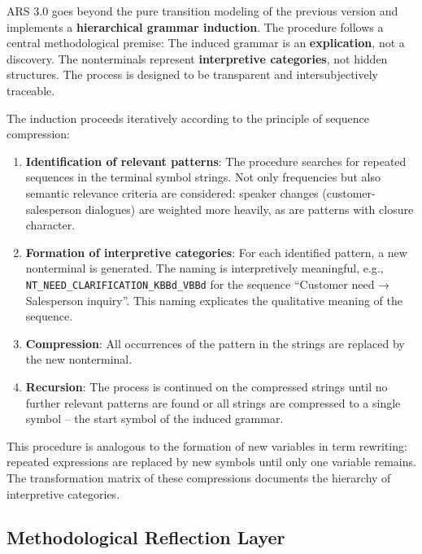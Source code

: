 \documentclass[
  12pt,
  a4paper,
  oneside,
  titlepage
]{article}
\begin{document}
ARS 3.0 goes beyond the pure transition modeling of the previous version 
and implements a \textbf{hierarchical grammar induction}. The procedure 
follows a central methodological premise: The induced grammar is an 
\textbf{explication}, not a discovery. The nonterminals represent 
\textbf{interpretive categories}, not hidden structures. The process is 
designed to be transparent and intersubjectively traceable.

The induction proceeds iteratively according to the principle of sequence 
compression:

\begin{enumerate}
    \item \textbf{Identification of relevant patterns}: The procedure 
    searches for repeated sequences in the terminal symbol strings. Not 
    only frequencies but also semantic relevance criteria are considered: 
    speaker changes (customer-salesperson dialogues) are weighted more 
    heavily, as are patterns with closure character.
    
    \item \textbf{Formation of interpretive categories}: For each 
    identified pattern, a new nonterminal is generated. The naming is 
    interpretively meaningful, e.g., \texttt{NT\_NEED\_CLARIFICATION\_KBBd\_VBBd} 
    for the sequence \enquote{Customer need → Salesperson inquiry}. This 
    naming explicates the qualitative meaning of the sequence.
    
    \item \textbf{Compression}: All occurrences of the pattern in the 
    strings are replaced by the new nonterminal.
    
    \item \textbf{Recursion}: The process is continued on the compressed 
    strings until no further relevant patterns are found or all strings 
    are compressed to a single symbol – the start symbol of the induced 
    grammar.
\end{enumerate}

This procedure is analogous to the formation of new variables in term 
rewriting: repeated expressions are replaced by new symbols until only 
one variable remains. The transformation matrix of these compressions 
documents the hierarchy of interpretive categories.

\subsection{Methodological Reflection Layer}
\end{document}

